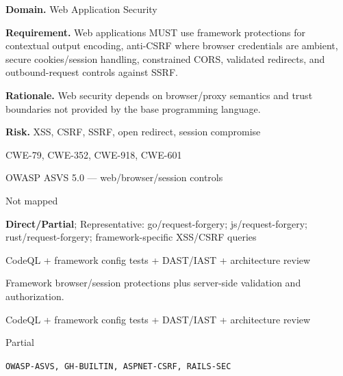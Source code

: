 \documentclass[10pt,letterpaper]{article}
\newcommand{\prioritybadge}[2]{\tcbox[on line,boxrule=0pt,arc=1.2mm,boxsep=0.7mm,left=1mm,right=1mm,top=0.4mm,bottom=0.4mm,colback=#2!12,coltext=#2]{\scriptsize\bfseries #1}}
\begin{document}
\begin{rulebox}[title={\texttt{SCS-ALL-WEB-001} \hfill \prioritybadge{Critical Control}{Critical}}]
\textbf{Domain.} Web Application Security

\textbf{Requirement.} Web applications MUST use framework protections for contextual output encoding, anti-CSRF where browser credentials are ambient, secure cookies/session handling, constrained CORS, validated redirects, and outbound-request controls against SSRF.

\textbf{Rationale.} Web security depends on browser/proxy semantics and trust boundaries not provided by the base programming language.

\textbf{Risk.} XSS, CSRF, SSRF, open redirect, session compromise

\begin{description}[leftmargin=2.65cm,labelwidth=2.3cm,style=nextline,itemsep=1pt,topsep=3pt]
  \item[CWE] CWE-79, CWE-352, CWE-918, CWE-601
  \item[OWASP] OWASP ASVS 5.0 --- web/browser/session controls
  \item[CERT] Not mapped
  \item[CodeQL] \textbf{Direct/Partial}; Representative: go/request-forgery; js/request-forgery; rust/request-forgery; framework-specific XSS/CSRF queries
  \item[Enforcement] CodeQL + framework config tests + DAST/IAST + architecture review
  \item[Prevention] Framework browser/session protections plus server-side validation and authorization.
  \item[Verification] CodeQL + framework config tests + DAST/IAST + architecture review
  \item[Automation] Partial
  \item[Sources] \texttt{OWASP-ASVS, GH-BUILTIN, ASPNET-CSRF, RAILS-SEC}
\end{description}
\end{rulebox}
\end{document}
